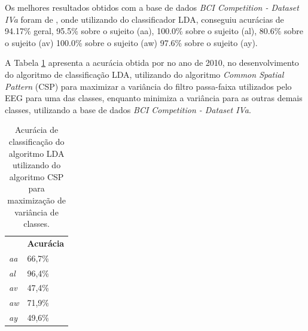 Os melhores resultados obtidos com a base de dados \textit{BCI Competition - Dataset IVa} foram de \cite{WangBCIWinner}, onde utilizando do classificador LDA, conseguiu acurácias de 94.17\% geral, 	95.5\% sobre o sujeito (aa), 100.0\% sobre o sujeito (al), 80.6\% sobre o sujeito (av) 100.0\% sobre o sujeito (aw) 97.6\% sobre o sujeito (ay).

A Tabela \ref{arte_state} apresenta a acurácia obtida por \cite{F.Lotte} no ano de 2010, no desenvolvimento do algoritmo de classificação LDA, utilizando do algoritmo \textit{Common Spatial Pattern} (CSP) para maximizar a variância do filtro passa-faixa utilizados pelo EEG para uma das classes, enquanto minimiza a variância para as outras demais classes, utilizando a base de dados \textit{BCI Competition - Dataset IVa}.
\begin{table}[h]
	\centering
	\caption{Acurácia de classificação do algoritmo LDA utilizando do algoritmo CSP para maximização de variância de classes. \cite{F.Lotte}}
	\label{arte_state}
\begin{tabular}{ll}
	\rowcolor[HTML]{ECF4FF} 
	\multicolumn{1}{c}{\cellcolor[HTML]{ECF4FF}\textbf{Sujeito}} & \multicolumn{1}{c}{\cellcolor[HTML]{ECF4FF}\textbf{Acurácia}} \\
	\textit{aa}                                                  & 66,7\%                                                        \\
	\rowcolor[HTML]{ECF4FF} 
	\textit{al}                                                  & 96,4\%                                                        \\
	\textit{av}                                                  & 47,4\%                                                        \\
	\rowcolor[HTML]{ECF4FF} 
	\textit{aw}                                                  & 71,9\%                                                        \\
	\textit{ay}                                                  & 49,6\%                                                       
\end{tabular}
\end{table}
